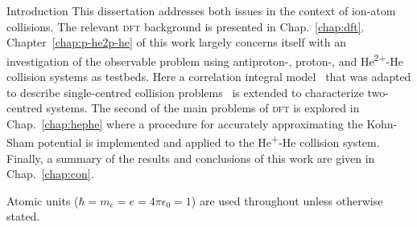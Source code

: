 \documentclass[a5paper, 9 pt]{extreport}
\begin{document}
\begin{chapter}{Introduction \label{chap:intro}}
   This dissertation addresses both issues in the context of ion-atom collisions. The relevant
   \textsc{dft} background is presented in Chap.~\ref{chap:dft}. Chapter~\ref{chap:p-he2p-he} of this
   work largely concerns itself with an investigation of the observable problem using antiproton-,
   proton-, and He\textsuperscript{2+}-He collision systems as testbeds. Here a correlation integral
   model~\cite{wb} that was adapted to describe single-centred collision problems~\cite{pbarhe} is
   extended to characterize two-centred systems. The second of the main problems of \textsc{dft} is
   explored in Chap.~\ref{chap:hephe} where a procedure for accurately approximating the Kohn-Sham
   potential is implemented and applied to the He\textsuperscript{+}-He collision system. Finally, a
   summary of the results and conclusions of this work are given in Chap.~\ref{chap:con}.

   Atomic units ($\hbar = m_e = e = 4 \pi \epsilon_0 = 1$) are used throughout unless otherwise stated.

\end{chapter}
\end{document}
